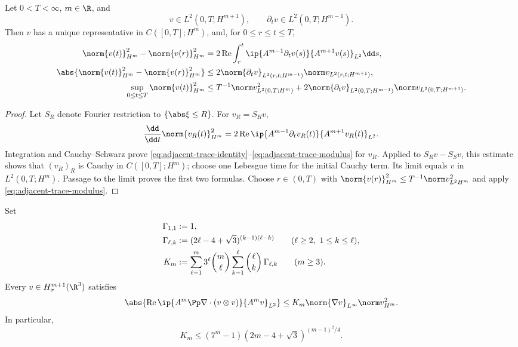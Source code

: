 \begin{lemma}
\label{lem:adjacent-trace}
Let \(0<T<\infty\), \(m\in\R\), and
\[
 v\in L^2(0,T;H^{m+1}),
 \qquad
 \partial_tv\in L^2(0,T;H^{m-1}).
\]
Then \(v\) has a unique representative in \(C([0,T];H^m)\), and, for
\(0\le r\le t\le T\),
\begin{align}
 \norm{v(t)}_{H^m}^2-\norm{v(r)}_{H^m}^2
 &=2\operatorname{Re}\int_r^t
 \ip{A^{m-1}\partial_tv(s)}{A^{m+1}v(s)}_{L^2}\dd s,
 \label{eq:adjacent-trace-identity}\\
 \abs{\norm{v(t)}_{H^m}^2-\norm{v(r)}_{H^m}^2}
 &\le2\norm{\partial_tv}_{L^2(r,t;H^{m-1})}
 \norm v_{L^2(r,t;H^{m+1})},
 \label{eq:adjacent-trace-modulus}\\
 \sup_{0\le t\le T}\norm{v(t)}_{H^m}^2
 &\le T^{-1}\norm v_{L^2(0,T;H^m)}^2
 +2\norm{\partial_tv}_{L^2(0,T;H^{m-1})}
 \norm v_{L^2(0,T;H^{m+1})}.
 \label{eq:adjacent-trace-sup}
\end{align}
\end{lemma}

\begin{proof}
Let \(S_R\) denote Fourier restriction to \(\{\abs\xi\le R\}\).  For
\(v_R=S_Rv\),
\[
 \frac{\dd}{\dd t}\norm{v_R(t)}_{H^m}^2
 =2\operatorname{Re}\ip{A^{m-1}\partial_tv_R(t)}
 {A^{m+1}v_R(t)}_{L^2}.
\]
Integration and Cauchy--Schwarz prove
\eqref{eq:adjacent-trace-identity}--\eqref{eq:adjacent-trace-modulus} for
\(v_R\).  Applied to \(S_Rv-S_Sv\), this estimate shows that
\((v_R)_R\) is Cauchy in \(C([0,T];H^m)\); choose one Lebesgue time for the
initial Cauchy term.  Its limit equals \(v\) in
\(L^2(0,T;H^m)\).  Passage to the limit proves the first two formulas.
Choose \(r\in(0,T)\) with
\(\norm{v(r)}_{H^m}^2\le T^{-1}\norm v_{L^2H^m}^2\) and apply
\eqref{eq:adjacent-trace-modulus}.
\end{proof}

\begin{lemma}
\label{lem:transport-commutator}
Set
\begin{align}
 \Gamma_{1,1}&:=1,\notag\\
 \Gamma_{\ell,k}
 &:=(2\ell-4+\sqrt3)^{(k-1)(\ell-k)}
 \qquad(\ell\ge2,\ 1\le k\le\ell),
 \label{eq:explicit-Gamma-lk}\\
 K_m&:=
 \sum_{\ell=1}^{m}3^\ell\binom m\ell
 \sum_{k=1}^{\ell}\binom\ell k\,\Gamma_{\ell,k}
 \qquad(m\ge3).
 \label{eq:explicit-commutator-constant}
\end{align}
Every \(v\in H^{m+1}_\sigma(\R^3)\) satisfies
\begin{equation}
 \abs{\operatorname{Re}
 \ip{A^m\Pp\nabla\cdot(v\otimes v)}{A^mv}_{L^2}}
 \le K_m\norm{\nabla v}_{L^\infty}\norm v_{H^m}^2.
 \label{eq:transport-commutator}
\end{equation}
In particular,
\begin{equation}
 K_m\le(7^m-1)(2m-4+\sqrt3)^{(m-1)^2/4}.
 \label{eq:explicit-commutator-upper-bound}
\end{equation}
\end{lemma}


